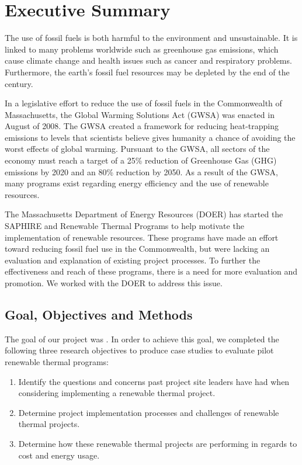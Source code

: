 \chapter*{Executive Summary}

\par The use of fossil fuels is both harmful to the environment and unsustainable. It is linked to many problems worldwide such as greenhouse gas emissions, which cause climate change and health issues such as cancer and respiratory problems. Furthermore, the earth's fossil fuel resources may be depleted by the end of the century.
\par In a legislative effort to reduce the use of fossil fuels in the Commonwealth of Massachusetts, the Global Warming Solutions Act (GWSA) was enacted in August of 2008. The GWSA created a framework for reducing heat-trapping emissions to levels that scientists believe gives humanity a chance of avoiding the worst effects of global warming. Pursuant to the GWSA, all sectors of the economy must reach a target of a 25\% reduction of Greenhouse Gas (GHG) emissions by 2020 and an 80\% reduction by 2050. As a result of the GWSA, many programs exist regarding energy efficiency and the use of renewable resources.
\par The Massachusetts Department of Energy Resources (DOER) has started the SAPHIRE and Renewable Thermal Programs to help motivate the implementation of renewable resources. These programs have made an effort toward reducing fossil fuel use in the Commonwealth, but were lacking an evaluation and explanation of existing project processes. To further the effectiveness and reach of these programs, there is a need for more evaluation and promotion. We worked with the DOER to address this issue.

\section*{Goal, Objectives and Methods}
\par The goal of our project was \goal. In order to achieve this goal, we completed the following three research objectives to produce case studies to evaluate pilot renewable thermal programs:
\begin{enumerate}
  \item{Identify the questions and concerns past project site leaders have had when considering implementing a renewable thermal project.}
  \item{Determine project implementation processes and challenges of renewable thermal projects.}
  \item{Determine how these renewable thermal projects are performing in regards to cost and energy usage.}
\end{enumerate}

